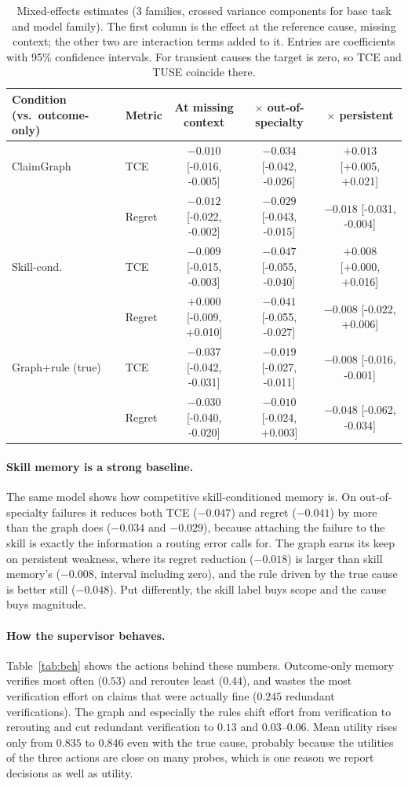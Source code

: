 \documentclass[letterpaper]{article}
\begin{document}
\begin{table}[t]
\centering\small
\begin{tabular}{llccc}
\toprule
Condition (vs.\ outcome-only) & Metric & At missing context & $\times$ out-of-specialty & $\times$ persistent\\
\midrule
ClaimGraph & TCE & $-0.010$ [-0.016, -0.005] & $-0.034$ [-0.042, -0.026] & $+0.013$ [+0.005, +0.021] \\
 & Regret & $-0.012$ [-0.022, -0.002] & $-0.029$ [-0.043, -0.015] & $-0.018$ [-0.031, -0.004] \\
\midrule
Skill-cond. & TCE & $-0.009$ [-0.015, -0.003] & $-0.047$ [-0.055, -0.040] & $+0.008$ [+0.000, +0.016] \\
 & Regret & $+0.000$ [-0.009, +0.010] & $-0.041$ [-0.055, -0.027] & $-0.008$ [-0.022, +0.006] \\
\midrule
Graph+rule (true) & TCE & $-0.037$ [-0.042, -0.031] & $-0.019$ [-0.027, -0.011] & $-0.008$ [-0.016, -0.001] \\
 & Regret & $-0.030$ [-0.040, -0.020] & $-0.010$ [-0.024, +0.003] & $-0.048$ [-0.062, -0.034] \\
\bottomrule
\end{tabular}
\caption{Mixed-effects estimates (3 families, crossed variance components for base task and model family). The first column is the effect at the reference cause, missing context; the other two are interaction terms added to it. Entries are coefficients with 95\% confidence intervals. For transient causes the target is zero, so TCE and TUSE coincide there.}
\label{tab:mixed}
\end{table}

\paragraph{Skill memory is a strong baseline.}
The same model shows how competitive skill-conditioned memory is. On out-of-specialty failures it reduces both TCE ($-0.047$) and regret ($-0.041$) by more than the graph does ($-0.034$ and $-0.029$), because attaching the failure to the skill is exactly the information a routing error calls for. The graph earns its keep on persistent weakness, where its regret reduction ($-0.018$) is larger than skill memory's ($-0.008$, interval including zero), and the rule driven by the true cause is better still ($-0.048$). Put differently, the skill label buys scope and the cause buys magnitude.

\paragraph{How the supervisor behaves.}
Table~\ref{tab:beh} shows the actions behind these numbers. Outcome-only memory verifies most often ($0.53$) and reroutes least ($0.44$), and wastes the most verification effort on claims that were actually fine ($0.245$ redundant verifications). The graph and especially the rules shift effort from verification to rerouting and cut redundant verification to $0.13$ and $0.03$--$0.06$. Mean utility rises only from $0.835$ to $0.846$ even with the true cause, probably because the utilities of the three actions are close on many probes, which is one reason we report decisions as well as utility.
\end{document}
